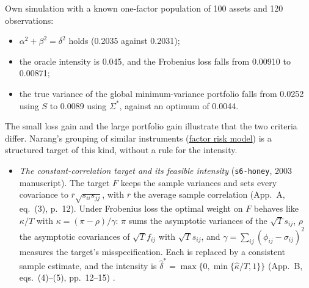 \begin{qfmethod}
 Own simulation with a known one-factor population of 100 assets and 120 observations:
\begin{itemize}
\item $\alpha^2+\beta^2=\delta^2$ holds (0.2035 against 0.2031);
\item the oracle intensity is 0.045, and the Frobenius loss falls from 0.00910 to 0.00871;
\item the true variance of the global minimum-variance portfolio falls from 0.0252 using $S$ to 0.0089 using $\Sigma^*$, against an optimum of 0.0044.
\end{itemize}
The small loss gain and the large portfolio gain illustrate that the two criteria differ. Narang's grouping of similar instruments (\hyperref[mod:factor-risk-model]{factor risk model}) is a structured target of this kind, without a rule for the intensity.

\begin{itemize}
\item \emph{The constant-correlation target and its feasible intensity} (\nolinkurl{s6-honey}, 2003 manuscript). The target $F$ keeps the sample variances and sets every covariance to $\bar r\sqrt{s_{ii}s_{jj}}$, with $\bar r$ the average sample correlation (App.~A, eq.~(3), p.~12). Under Frobenius loss the optimal weight on $F$ behaves like $\kappa/T$ with $\kappa=(\pi-\rho)/\gamma$: $\pi$ sums the asymptotic variances of the $\sqrt T s_{ij}$, $\rho$ the asymptotic covariances of $\sqrt Tf_{ij}$ with $\sqrt Ts_{ij}$, and $\gamma=\sum_{ij}(\phi_{ij}-\sigma_{ij})^2$ measures the target's misspecification. Each is replaced by a consistent sample estimate, and the intensity is $\hat\delta^*=\max\{0,\min\{\hat\kappa/T,1\}\}$ (App.~B, eqs.~(4)--(5), pp.~12--15) \citep[App.~A--B, pp.~12--15]{s6-honey}.


\end{itemize}
\end{qfmethod}
